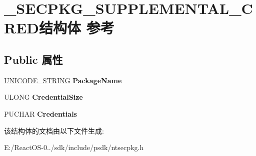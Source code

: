 \hypertarget{struct___s_e_c_p_k_g___s_u_p_p_l_e_m_e_n_t_a_l___c_r_e_d}{}\section{\+\_\+\+S\+E\+C\+P\+K\+G\+\_\+\+S\+U\+P\+P\+L\+E\+M\+E\+N\+T\+A\+L\+\_\+\+C\+R\+E\+D结构体 参考}
\label{struct___s_e_c_p_k_g___s_u_p_p_l_e_m_e_n_t_a_l___c_r_e_d}
\subsection*{Public 属性}
\begin{DoxyCompactItemize}
\item 
\mbox{\label{struct___s_e_c_p_k_g___s_u_p_p_l_e_m_e_n_t_a_l___c_r_e_d_aeca16bb34ac224bbf77a5ca8a071e557}} 
\hyperlink{struct___u_n_i_c_o_d_e___s_t_r_i_n_g}{U\+N\+I\+C\+O\+D\+E\+\_\+\+S\+T\+R\+I\+NG} {\bfseries Package\+Name}
\item 
\mbox{\label{struct___s_e_c_p_k_g___s_u_p_p_l_e_m_e_n_t_a_l___c_r_e_d_a4f02fc0f78c13f0cfaa2eb1afc68b01a}} 
U\+L\+O\+NG {\bfseries Credential\+Size}
\item 
\mbox{\label{struct___s_e_c_p_k_g___s_u_p_p_l_e_m_e_n_t_a_l___c_r_e_d_aa4234a8c906b25cb6cdc491e9dc98225}} 
P\+U\+C\+H\+AR {\bfseries Credentials}
\end{DoxyCompactItemize}


该结构体的文档由以下文件生成\+:\begin{DoxyCompactItemize}
\item 
E\+:/\+React\+O\+S-\/0../sdk/include/psdk/ntsecpkg.\+h\end{DoxyCompactItemize}
